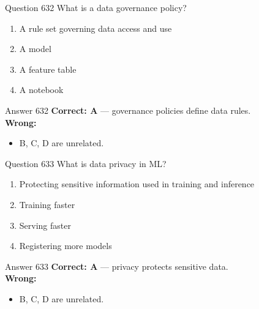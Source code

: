 \documentclass[aspectratio=169,11pt]{beamer}
\begin{document}
	\begin{frame}{Question 632}
		What is a data governance policy?
		\begin{enumerate}[label=\Alph*.]
			\item A rule set governing data access and use
			\item A model
			\item A feature table
			\item A notebook
		\end{enumerate}
	\end{frame}
	\begin{frame}{Answer 632}
		\textbf{Correct: A} --- governance policies define data rules.\\
		\vspace{0.5em}
		\textbf{Wrong:}
		\begin{itemize}
			\item B, C, D are unrelated.
		\end{itemize}
	\end{frame}
	
	\begin{frame}{Question 633}
		What is data privacy in ML?
		\begin{enumerate}[label=\Alph*.]
			\item Protecting sensitive information used in training and inference
			\item Training faster
			\item Serving faster
			\item Registering more models
		\end{enumerate}
	\end{frame}
	\begin{frame}{Answer 633}
		\textbf{Correct: A} --- privacy protects sensitive data.\\
		\vspace{0.5em}
		\textbf{Wrong:}
		\begin{itemize}
			\item B, C, D are unrelated.
		\end{itemize}
	\end{frame}
	
\end{document}
